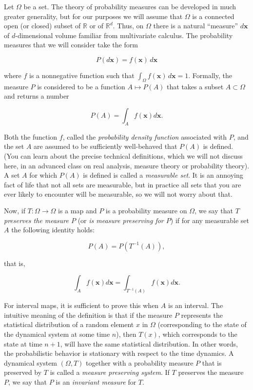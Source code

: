 \documentclass[11pt]{report}
\theoremstyle{plain}
\theoremstyle{definition}
\begin{document}
Let $\Omega$ be a set. The theory of probability
measures can be developed in much greater generality,
but for our purposes we will assume that $\Omega$ is a
connected open (or closed) subset of $\mathbb{R}$ or
of $\mathbb{R}^d$. Thus, on $\Omega$ there is a
natural ``measure'' $d\mathbf{x}$ of $d$-dimensional
volume familiar from multivariate calculus. The
probability measures that we will consider take the
form

\[
P(d\mathbf{x})=f(\mathbf{x})\,d\mathbf{x}
\]

\noindent where $f$ is a nonnegative function such that
$\int_{\Omega} f(\mathbf{x})\,d\mathbf{x} = 1$.
Formally, the measure $P$ is considered to be a
function $A\mapsto P(A)$ that takes a subset
$A\subset \Omega$ and returns a number

\[
P(A) = \int_A f(\mathbf{x})d\mathbf{x}.
\]

\noindent Both the function $f$, called the \emph{probability density
function} associated with $P$, and the set $A$ are
assumed to be sufficiently well-behaved that $P(A)$ is
defined. (You can learn about the precise technical
definitions, which we will not discuss here, in an
advanced class on real analysis, measure theory or
probability theory). A set $A$ for which $P(A)$ is
defined is called a \emph{measurable set}. It is an
annoying fact of life that not all sets are
measurable, but in practice all sets that you are ever
likely to encounter will be measurable, so we will not
worry about that.

Now, if $T:\Omega\to \Omega$ is a map and $P$ is a
probability measure on $\Omega$, we say that $T$\emph{preserves the measure $P$} (or \emph{is measure preserving
for $P$}) if for any measurable set $A$ the following
identity holds:

\[
P(A) = P(T^{-1}(A)),
\]

\noindent that is,

\[
\int_A f(\mathbf{x})d\mathbf{x} = \int_{T^{-1}(A)} f(\mathbf{x})d\mathbf{x}.
\]

\noindent For interval maps, it is sufficient to prove this when
$A$ is an interval. The intuitive meaning of the
definition is that if the measure $P$ represents the
statistical distribution of a random element $x$ in
$\Omega$ (corresponding to the state of the dynamical
system at some time $n$), then $T(x)$, which
corresponds to the state at time $n+1$, will have the
same statistical distribution. In other words, the
probabilistic behavior is stationary with respect to
the time dynamics. A dynamical system $(\Omega, T)$
together with a probability measure $P$ that is
preserved by $T$ is called a \emph{measure preserving
system}. If $T$ preserves the measure $P$, we say that
$P$ is an \emph{invariant measure} for $T$.
\end{document}
